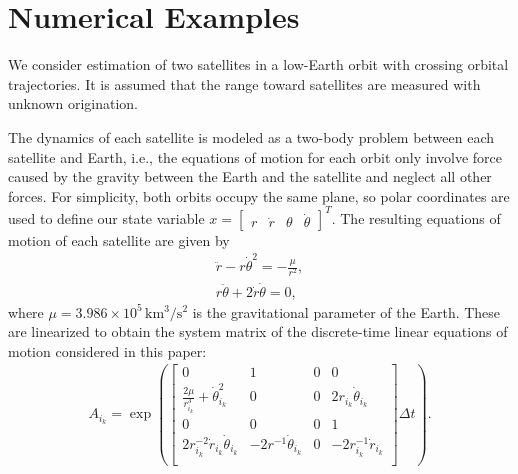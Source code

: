 \documentclass[letterpaper, 10pt, conference]{ieeeconf}
\begin{document}
\section{Numerical Examples}
\label{NumRes}




We consider estimation of two satellites in a low-Earth orbit with crossing orbital trajectories. It is assumed that the range toward satellites are measured with unknown origination. 

The dynamics of each satellite is modeled as a two-body problem between each satellite and Earth, i.e., the equations of motion for each orbit only involve force caused by the gravity between the Earth and the satellite and neglect all other forces. For simplicity, both orbits occupy the same plane, so polar coordinates are used to define our state variable $x=\begin{bmatrix} r & \dot r & \theta & \dot \theta\end{bmatrix}^{T}$. The resulting equations of motion of each satellite are given by
\begin{gather*}
\ddot r - r\dot\theta^2 = -\frac{\mu}{r^2},\\
r\ddot\theta + 2\dot r\dot\theta =0,
\end{gather*}
where $\mu=3.986\times10^5\, \mathrm{km^3/s^2}$ is the gravitational parameter of the Earth. These are linearized to obtain the system matrix of the discrete-time linear equations of motion considered in this paper:
\begin{align}
A_{i_k}=
\exp\left(\begin{bmatrix}
0 & 1 & 0 & 0 \\
\frac{2\mu}{r_{i_k}^3} +\dot\theta^2_{i_k} & 0 & 0 & 2r_{i_k}\dot \theta_{i_k} \\
0 & 0 & 0 & 1 \\
2r_{i_k}^{-2}\dot r_{i_k}\dot\theta_{i_k} & -2r^{-1}\dot\theta_{i_k} & 0 &  -2r_{i_k}^{-1}\dot r_{i_k}\\
\end{bmatrix}\Delta t\right).
\end{align}
\end{document}
